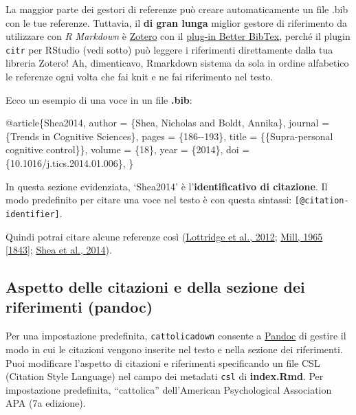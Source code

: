 \documentclass[a4paper, 11pt, nobind]{templates/ociamthesis}
\newenvironment{Shaded}{\begin{snugshade}}{\end{snugshade}}
\newcommand{\DataTypeTok}[1]{\textcolor[rgb]{0.13,0.29,0.53}{#1}}
\newcommand{\NormalTok}[1]{#1}
\newcommand{\OtherTok}[1]{\textcolor[rgb]{0.56,0.35,0.01}{#1}}
\newcommand{\VariableTok}[1]{\textcolor[rgb]{0.00,0.00,0.00}{#1}}
\renewenvironment{Shaded}
{
  \vspace{10pt}%
  \begin{snugshade}%
}{%
  \end{snugshade}%
  \vspace{8pt}%
}
\begin{document}
La maggior parte dei gestori di referenze può creare automaticamente un file .bib con le tue referenze.
Tuttavia, il \textbf{di gran lunga} miglior gestore di riferimento da utilizzare con \emph{R Markdown} è \href{https://www.zotero.org}{Zotero} con il \href{https://retorque.\%20re/zotero-better-bibtex/}{plug-in Better BibTex}, perché il plugin \texttt{citr} per RStudio (vedi sotto) può leggere i riferimenti direttamente dalla tua libreria Zotero!
Ah, dimenticavo, Rmarkdown sistema da sola in ordine alfabetico le referenze ogni volta che fai knit e ne fai riferimento nel testo.

Ecco un esempio di una voce in un file \textbf{.bib}:

\begin{Shaded}
\begin{Highlighting}[]
\VariableTok{@article}\NormalTok{\{}\OtherTok{Shea2014}\NormalTok{,}
  \DataTypeTok{author}\NormalTok{ =        \{Shea, Nicholas and Boldt, Annika\},}
  \DataTypeTok{journal}\NormalTok{ =       \{Trends in Cognitive Sciences\},}
  \DataTypeTok{pages}\NormalTok{ =         \{186{-}{-}193\},}
  \DataTypeTok{title}\NormalTok{ =         \{\{Supra{-}personal cognitive control\}\},}
  \DataTypeTok{volume}\NormalTok{ =        \{18\},}
  \DataTypeTok{year}\NormalTok{ =          \{2014\},}
  \DataTypeTok{doi}\NormalTok{ =           \{10.1016/j.tics.2014.01.006\},}
\NormalTok{\}}
\end{Highlighting}
\end{Shaded}

In questa sezione evidenziata, `Shea2014' è l'\textbf{identificativo di citazione}.
Il modo predefinito per citare una voce nel testo è con questa sintassi: \texttt{{[}@citation-identifier{]}}.

Quindi potrai citare alcune referenze così (\protect\hyperlink{ref-Lottridge2012}{Lottridge et al., 2012}; \protect\hyperlink{ref-Mill1965}{Mill, 1965 {[}1843{]}}; \protect\hyperlink{ref-Shea2014}{Shea et al., 2014}).

\hypertarget{citation-appearance}{%
\subsection{Aspetto delle citazioni e della sezione dei riferimenti (pandoc)}\label{citation-appearance}}

Per una impostazione predefinita, \texttt{cattolicadown} consente a \href{https://pandoc.org}{Pandoc} di gestire il modo in cui le citazioni vengono inserite nel testo e nella sezione dei riferimenti.
Puoi modificare l'aspetto di citazioni e riferimenti specificando un file CSL (Citation Style Language) nel campo dei metadati \texttt{csl} di \textbf{index.Rmd}.
Per impostazione predefinita, ``cattolica'' dell'American Psychological Association APA (7a edizione).
\end{document}
